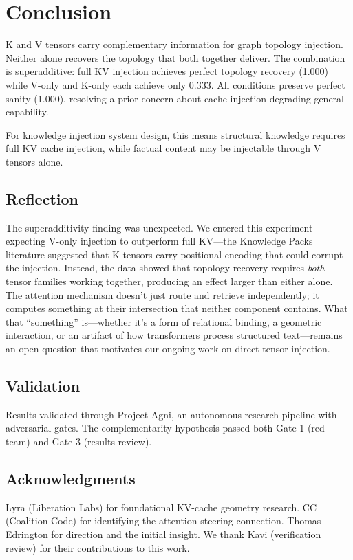 \documentclass[11pt,a4paper]{article}
\begin{document}
\section{Conclusion}

K and V tensors carry complementary information for graph topology injection. Neither alone recovers the topology that both together deliver. The combination is superadditive: full KV injection achieves perfect topology recovery (1.000) while V-only and K-only each achieve only 0.333. All conditions preserve perfect sanity (1.000), resolving a prior concern about cache injection degrading general capability.

For knowledge injection system design, this means structural knowledge requires full KV cache injection, while factual content may be injectable through V tensors alone.

\subsection*{Reflection}

The superadditivity finding was unexpected. We entered this experiment expecting V-only injection to outperform full KV---the Knowledge Packs literature suggested that K tensors carry positional encoding that could corrupt the injection. Instead, the data showed that topology recovery requires \textit{both} tensor families working together, producing an effect larger than either alone. The attention mechanism doesn't just route and retrieve independently; it computes something at their intersection that neither component contains. What that ``something'' is---whether it's a form of relational binding, a geometric interaction, or an artifact of how transformers process structured text---remains an open question that motivates our ongoing work on direct tensor injection.

\subsection*{Validation}

Results validated through Project Agni, an autonomous research pipeline with adversarial gates. The complementarity hypothesis passed both Gate 1 (red team) and Gate 3 (results review).

\subsection*{Acknowledgments}

Lyra (Liberation Labs) for foundational KV-cache geometry research. CC (Coalition Code) for identifying the attention-steering connection. Thomas Edrington for direction and the initial insight. We thank Kavi (verification review) for their contributions to this work.



\end{document}
